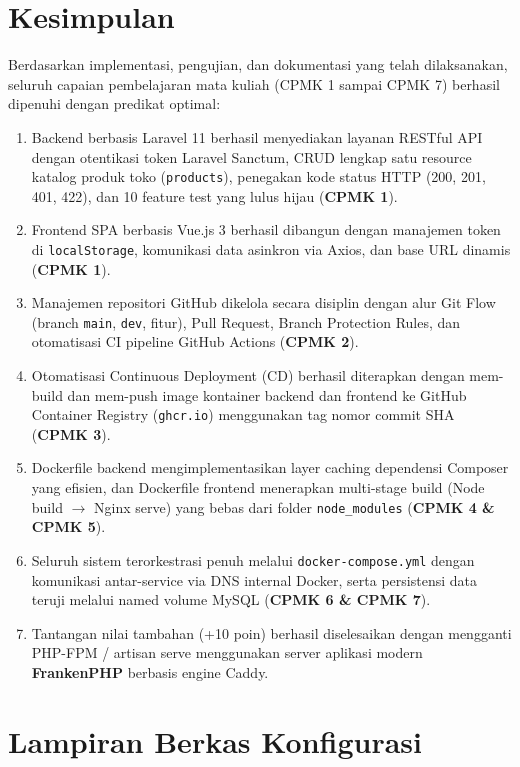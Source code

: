 \documentclass[11pt,a4paper]{article}
\begin{document}
\section{Kesimpulan}
Berdasarkan implementasi, pengujian, dan dokumentasi yang telah dilaksanakan, seluruh capaian pembelajaran mata kuliah (CPMK 1 sampai CPMK 7) berhasil dipenuhi dengan predikat optimal:
\begin{enumerate}
    \item Backend berbasis Laravel 11 berhasil menyediakan layanan RESTful API dengan otentikasi token Laravel Sanctum, CRUD lengkap satu resource katalog produk toko (\texttt{products}), penegakan kode status HTTP (200, 201, 401, 422), dan 10 feature test yang lulus hijau (\textbf{CPMK 1}).
    \item Frontend SPA berbasis Vue.js 3 berhasil dibangun dengan manajemen token di \texttt{localStorage}, komunikasi data asinkron via Axios, dan base URL dinamis (\textbf{CPMK 1}).
    \item Manajemen repositori GitHub dikelola secara disiplin dengan alur Git Flow (branch \texttt{main}, \texttt{dev}, fitur), Pull Request, Branch Protection Rules, dan otomatisasi CI pipeline GitHub Actions (\textbf{CPMK 2}).
    \item Otomatisasi Continuous Deployment (CD) berhasil diterapkan dengan mem-build dan mem-push image kontainer backend dan frontend ke GitHub Container Registry (\texttt{ghcr.io}) menggunakan tag nomor commit SHA (\textbf{CPMK 3}).
    \item Dockerfile backend mengimplementasikan layer caching dependensi Composer yang efisien, dan Dockerfile frontend menerapkan multi-stage build (Node build $\rightarrow$ Nginx serve) yang bebas dari folder \texttt{node\_modules} (\textbf{CPMK 4 \& CPMK 5}).
    \item Seluruh sistem terorkestrasi penuh melalui \texttt{docker-compose.yml} dengan komunikasi antar-service via DNS internal Docker, serta persistensi data teruji melalui named volume MySQL (\textbf{CPMK 6 \& CPMK 7}).
    \item Tantangan nilai tambahan (+10 poin) berhasil diselesaikan dengan mengganti PHP-FPM / artisan serve menggunakan server aplikasi modern \textbf{FrankenPHP} berbasis engine Caddy.
\end{enumerate}

\newpage
\appendix
\section{Lampiran Berkas Konfigurasi}
\end{document}
